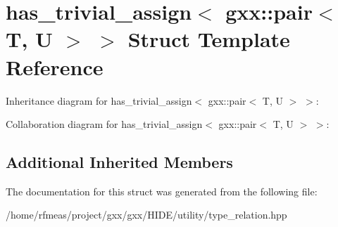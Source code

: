 \hypertarget{structhas__trivial__assign_3_01gxx_1_1pair_3_01T_00_01U_01_4_01_4}{}\section{has\+\_\+trivial\+\_\+assign$<$ gxx\+:\+:pair$<$ T, U $>$ $>$ Struct Template Reference}
\label{structhas__trivial__assign_3_01gxx_1_1pair_3_01T_00_01U_01_4_01_4}


Inheritance diagram for has\+\_\+trivial\+\_\+assign$<$ gxx\+:\+:pair$<$ T, U $>$ $>$\+:


Collaboration diagram for has\+\_\+trivial\+\_\+assign$<$ gxx\+:\+:pair$<$ T, U $>$ $>$\+:
\subsection*{Additional Inherited Members}


The documentation for this struct was generated from the following file\+:\begin{DoxyCompactItemize}
\item 
/home/rfmeas/project/gxx/gxx/\+H\+I\+D\+E/utility/type\+\_\+relation.\+hpp\end{DoxyCompactItemize}
